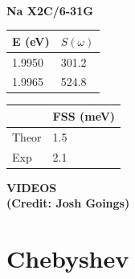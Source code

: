 \documentclass{beamer}
\begin{document}
\begin{frame}
\begin{minipage}[h!]{0.50\textwidth}
\begin{minipage}[h!]{0.47\textwidth}
\small
~\\
\textbf{Na X2C/6-31G}
\vspace{-0.5cm}
\begin{table}
\begin{tabular}{|l|l|}
\hline
E (eV) & $S(\omega)$ \\
\hline
\hline
1.9950 & 301.2\\
1.9965 & 524.8\\
\hline
\end{tabular}
\end{table}
\vspace{-0.5cm}
\begin{table}
\begin{tabular}{|l|l|}
\hline
 & FSS (meV) \\
\hline
\hline
Theor & 1.5\\
Exp & 2.1\\
\hline
\end{tabular}
\end{table}
\end{minipage}

\end{minipage}
\end{frame}

\begin{frame}
\centering \LARGE \bf VIDEOS\\
\Large (Credit: Josh Goings)
\end{frame}

\section{Chebyshev}
\end{document}
